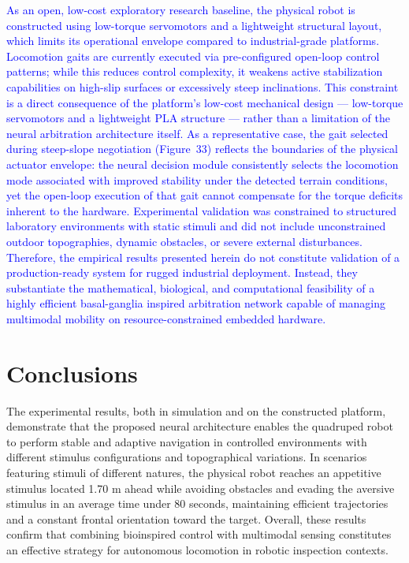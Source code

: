 \documentclass[preprint,12pt]{elsarticle}
\newcommand{\revblue}[1]{\textcolor{blue}{#1}}
\begin{document}
\revblue{As an open, low-cost exploratory research baseline, the physical robot is constructed using low-torque servomotors and a lightweight structural layout, which limits its operational envelope compared to industrial-grade platforms. Locomotion gaits are currently executed via pre-configured open-loop control patterns; while this reduces control complexity, it weakens active stabilization capabilities on high-slip surfaces or excessively steep inclinations. This constraint is a direct consequence of the platform's low-cost mechanical design --- low-torque servomotors and a lightweight PLA structure --- rather than a limitation of the neural arbitration architecture itself. As a representative case, the gait selected during steep-slope negotiation (Figure~33) reflects the boundaries of the physical actuator envelope: the neural decision module consistently selects the locomotion mode associated with improved stability under the detected terrain conditions, yet the open-loop execution of that gait cannot compensate for the torque deficits inherent to the hardware. Experimental validation was constrained to structured laboratory environments with static stimuli and did not include unconstrained outdoor topographies, dynamic obstacles, or severe external disturbances. Therefore, the empirical results presented herein do not constitute validation of a production-ready system for rugged industrial deployment. Instead, they substantiate the mathematical, biological, and computational feasibility of a highly efficient basal-ganglia inspired arbitration network capable of managing multimodal mobility on resource-constrained embedded hardware.}

\section{Conclusions}

The experimental results, both in simulation and on the constructed platform, demonstrate that the proposed neural architecture enables the quadruped robot to perform stable and adaptive navigation in controlled environments with different stimulus configurations and topographical variations. In scenarios featuring stimuli of different natures, the physical robot reaches an appetitive stimulus located 1.70 m ahead while avoiding obstacles and evading the aversive stimulus in an average time under 80 seconds, maintaining efficient trajectories and a constant frontal orientation toward the target. Overall, these results confirm that combining bioinspired control with multimodal sensing constitutes an effective strategy for autonomous locomotion in robotic inspection contexts. 
\end{document}
